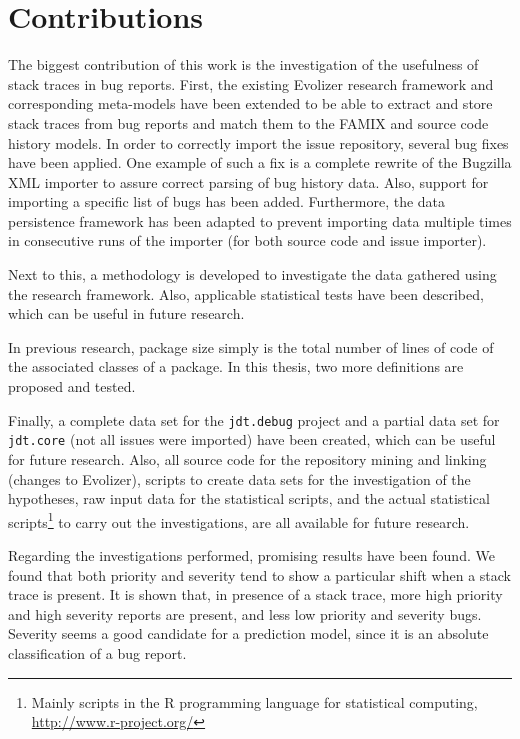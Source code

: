 \section{Contributions}
The biggest contribution of this work is the investigation of the usefulness of stack traces in bug reports. First, the existing Evolizer research framework and corresponding meta-models \cite{Gall2009} have been extended to be able to extract and store stack traces from bug reports and match them to the FAMIX \cite{Tichelaar2001,Tichelaar2000} and source code history models. In order to correctly import the issue repository, several bug fixes have been applied. One example of such a fix is a complete rewrite of the Bugzilla XML importer to assure correct parsing of bug history data. Also, support for importing a specific list of bugs has been added. Furthermore, the data persistence framework has been adapted to prevent importing data multiple times in consecutive runs of the importer (for both source code and issue importer). 

Next to this, a methodology is developed to investigate the data gathered using the research framework. Also, applicable statistical tests have been described, which can be useful in future research.

In previous research, package size simply is the total number of lines of code of the associated classes of a package. In this thesis, two more definitions are proposed and tested.

Finally, a complete data set for the \texttt{jdt.debug} project and a partial data set for \texttt{jdt.core} (not all issues were imported) have been created, which can be useful for future research. Also, all source code for the repository mining and linking (changes to Evolizer), scripts to create data sets for the investigation of the hypotheses, raw input data for the statistical scripts, and the actual statistical scripts\footnote{Mainly scripts in the R programming language for statistical computing, \url{http://www.r-project.org/}} to carry out the investigations, are all available for future research.

Regarding the investigations performed, promising results have been found. We found that both priority and severity tend to show a particular shift when a stack trace is present. It is shown that, in presence of a stack trace, more high priority and high severity reports are present, and less low priority and severity bugs. Severity seems a good candidate for a prediction model, since it is an absolute classification of a bug report. 

